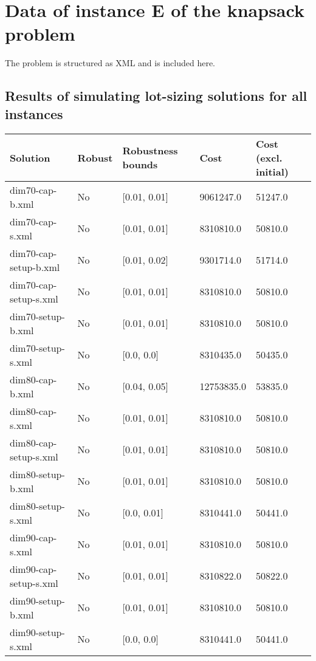 \chapter{Data of instance E of the knapsack problem}
\label{app:kp_scenario}
The problem is structured as XML and is included here.
\begin{small}
\end{small}

\section{Results of simulating lot-sizing solutions for all instances}

\begin{table}[!hbp]
\label{tab:instance1_results}
\begin{tabular}{lllll}
\hline
Solution 	& Robust  	& Robustness bounds 	& Cost 	& Cost (excl. initial) \\
\hline
\hline
dim70-cap-b.xml 	& No 	&  [0.01, 0.01] 	& 9061247.0 	& 51247.0\\
dim70-cap-s.xml 	& No 	&  [0.01, 0.01] 	& 8310810.0 	& 50810.0\\
dim70-cap-setup-b.xml 	& No 	&  [0.01, 0.02] 	& 9301714.0 	& 51714.0\\
dim70-cap-setup-s.xml 	& No 	&  [0.01, 0.01] 	& 8310810.0 	& 50810.0\\
dim70-setup-b.xml 	& No 	&  [0.01, 0.01] 	& 8310810.0 	& 50810.0\\
dim70-setup-s.xml 	& No 	&  [0.0, 0.0] 	& 8310435.0 	& 50435.0\\
dim80-cap-b.xml 	& No 	&  [0.04, 0.05] 	& 12753835.0 	& 53835.0\\
dim80-cap-s.xml 	& No 	&  [0.01, 0.01] 	& 8310810.0 	& 50810.0\\
dim80-cap-setup-s.xml 	& No 	&  [0.01, 0.01] 	& 8310810.0 	& 50810.0\\
dim80-setup-b.xml 	& No 	&  [0.01, 0.01] 	& 8310810.0 	& 50810.0\\
dim80-setup-s.xml 	& No 	&  [0.0, 0.01] 	& 8310441.0 	& 50441.0\\
dim90-cap-s.xml 	& No 	&  [0.01, 0.01] 	& 8310810.0 	& 50810.0\\
dim90-cap-setup-s.xml 	& No 	&  [0.01, 0.01] 	& 8310822.0 	& 50822.0\\
dim90-setup-b.xml 	& No 	&  [0.01, 0.01] 	& 8310810.0 	& 50810.0\\
dim90-setup-s.xml 	& No 	&  [0.0, 0.0] 	& 8310441.0 	& 50441.0\\

\end{tabular}
\end{table}
